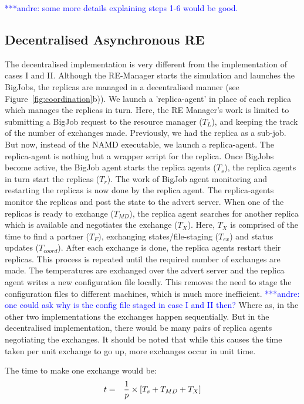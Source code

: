 \documentclass{rspublic}
\newcommand{\alnote}[1]{ {\textcolor{blue} { ***andre: #1 }}}
\newcommand{\alnote}[1]{}
\begin{document}
 \alnote{some more details explaining steps 1-6 would be good.}%

\subsection{Decentralised Asynchronous RE}

The decentralised implementation is very different from the implementation 
of cases I and II. Although the RE-Manager starts the simulation and launches 
the BigJobs, the replicas are managed in a decentralised manner 
(see Figure~\ref{fig:coordination}b)). We launch
a 'replica-agent' in place of each replica which manages the replicas in turn.
Here, the RE Manager's work is limited to submitting a BigJob request to the 
resource manager ($T_{L}$), and keeping the track of the number of exchanges made. 
Previously, we had the replica as a sub-job. But now, instead of the NAMD executable, 
we launch a replica-agent.
The replica-agent is nothing but a wrapper script for the replica. 
Once BigJobs become active, the BigJob agent starts the replica agents ($T_{s}$), 
the replica agents in turn start the replicas ($T_{r}$). The work of BigJob agent 
monitoring and restarting the replicas is now done by the replica agent. The replica-agents 
monitor the replicas and post the state to the advert server. When one of the 
replicas is ready to exchange ($T_{MD}$), the replica agent searches for another replica which is 
available and negotiates the exchange ($T_{X}$). Here, $T_{X}$ is comprised of the time to find a partner ($T_{F}$), exchanging states/file-staging ($T_{ex}$) and status updates ($T_{coord}$). 
After each exchange is done, the replica agents restart their replicas. This process is repeated until the required number of 
exchanges are made. The temperatures are exchanged over the advert server and the replica agent writes a new configuration file locally. This removes the need to stage the 
configuration files to different machines, which is much more inefficient. \alnote {one could ask why is the 
config file staged in case I and II then?} Where as, in the other two implementations the exchanges happen sequentially. But in the decentralised implementation, there would be many pairs of replica agents negotiating the exchanges. It should be noted that while this causes the time taken per unit exchange to go up, more exchanges occur in unit time. 


The time to make one exchange would be:
\begin{eqnarray}
t &=&  {1 \over p} \times {[T_s+T_{MD} + T_{X}]} 
\label{eq:decent}
\end{eqnarray}
\end{document}
